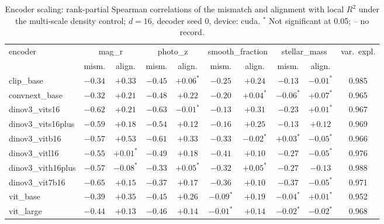 \begin{table}[t]
\centering\footnotesize\setlength{\tabcolsep}{3pt}
\begin{tabular}{lccccccccc}
\toprule
encoder & \multicolumn{2}{c}{mag\_r} & \multicolumn{2}{c}{photo\_z} & \multicolumn{2}{c}{smooth\_fraction} & \multicolumn{2}{c}{stellar\_mass} & var.\ expl. \\
 & mism. & align. & mism. & align. & mism. & align. & mism. & align. & \\
\midrule
clip\_base & $-0.34$ & $+0.33$ & $-0.45$ & $+0.06^{*}$ & $-0.25$ & $+0.24$ & $-0.13$ & $-0.01^{*}$ & 0.985 \\
convnext\_base & $-0.32$ & $+0.21$ & $-0.48$ & $+0.22$ & $-0.20$ & $+0.04^{*}$ & $-0.06^{*}$ & $+0.07^{*}$ & 0.965 \\
dinov3\_vits16 & $-0.62$ & $+0.21$ & $-0.63$ & $-0.01^{*}$ & $-0.13$ & $+0.31$ & $-0.23$ & $+0.01^{*}$ & 0.967 \\
dinov3\_vits16plus & $-0.59$ & $+0.18$ & $-0.54$ & $+0.12$ & $-0.16$ & $+0.25$ & $-0.13$ & $+0.12$ & 0.969 \\
dinov3\_vitb16 & $-0.57$ & $+0.53$ & $-0.61$ & $+0.33$ & $-0.33$ & $-0.02^{*}$ & $+0.03^{*}$ & $-0.05^{*}$ & 0.966 \\
dinov3\_vitl16 & $-0.55$ & $+0.01^{*}$ & $-0.49$ & $+0.18$ & $-0.41$ & $+0.10$ & $-0.27$ & $-0.05^{*}$ & 0.976 \\
dinov3\_vith16plus & $-0.57$ & $-0.08^{*}$ & $-0.33$ & $+0.05^{*}$ & $-0.32$ & $+0.05^{*}$ & $-0.27$ & $-0.13$ & 0.988 \\
dinov3\_vit7b16 & $-0.65$ & $+0.15$ & $-0.37$ & $+0.17$ & $-0.36$ & $+0.10$ & $-0.37$ & $-0.05^{*}$ & 0.971 \\
vit\_base & $-0.39$ & $+0.35$ & $-0.45$ & $+0.26$ & $-0.09^{*}$ & $+0.19$ & $-0.04^{*}$ & $+0.01^{*}$ & 0.952 \\
vit\_large & $-0.44$ & $+0.13$ & $-0.46$ & $+0.14$ & $-0.01^{*}$ & $+0.14$ & $-0.02^{*}$ & $-0.02^{*}$ & 0.968 \\
\bottomrule
\end{tabular}
\caption{Encoder scaling: rank-partial Spearman correlations of the mismatch and alignment with local $R^2$ under the multi-scale density control; $d=16$, decoder seed 0, device: cuda. $^{*}$ Not significant at 0.05; -- no record.}
\label{tab:scaling_main}
\end{table}

